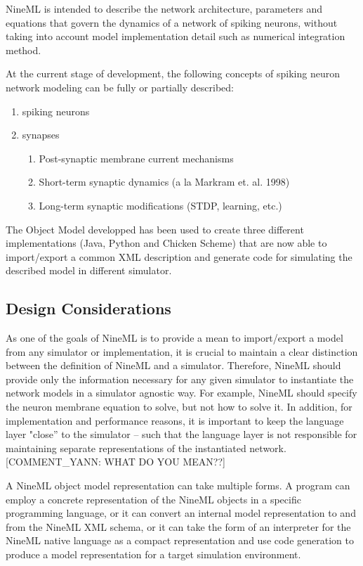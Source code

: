 \documentclass{article}
\begin{document}
NineML is intended to describe the network architecture, parameters
and equations that govern the dynamics of a network of spiking
neurons, without taking into account model implementation detail such as numerical integration method. 

At the current stage of development, the following concepts of spiking neuron network modeling can be fully or partially described:

\begin{enumerate}
\item spiking neurons
\item synapses
\begin{enumerate}
\item Post-synaptic membrane current mechanisms
\item Short-term synaptic dynamics (a la Markram et. al. 1998)
\item Long-term synaptic modifications (STDP, learning, etc.)
\end{enumerate}
\end{enumerate}

The Object Model developped has been used to create three different implementations (Java, Python and Chicken Scheme) that are now able to import/export a common XML description and generate code for simulating the described model in different simulator.

\subsection{Design Considerations}

As one of the goals of NineML is to provide a mean to import/export a model from any simulator or implementation, it is crucial to maintain a clear distinction between the definition of NineML and a simulator. Therefore, NineML should provide only the information necessary for any given simulator
to instantiate the network models in a simulator agnostic way.  
For example, NineML should specify the neuron membrane equation to solve,
but not how to solve it.  In addition, for implementation and performance reasons, it is important to keep the language layer "close'' to the simulator – such that the language layer is not responsible for maintaining separate representations of the instantiated network. [COMMENT_YANN: WHAT DO YOU MEAN??]

A NineML object model representation can take multiple forms.  A
program can employ a concrete representation of the NineML objects in
a specific programming language, or it can convert an internal model
representation to and from the NineML XML schema, or it can take the
form of an interpreter for the NineML native language as a compact
representation and use code generation to produce a model
representation for a target simulation environment.
\end{document}
